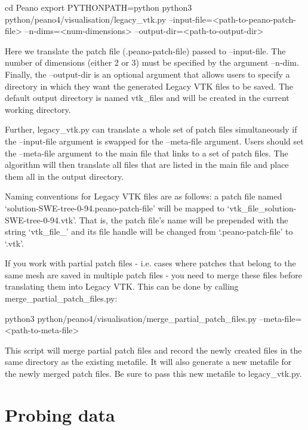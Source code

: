 \begin{code}
cd Peano
export PYTHONPATH=python
python3 python/peano4/visualisation/legacy_vtk.py --input-file=<path-to-peano-patch-file>
    --n-dims=<num-dimensions> --output-dir=<path-to-output-dir>
\end{code}

Here we translate the patch file (.peano-patch-file) passed to --input-file. The number of dimensions (either 2 or 3) must be specified by the argument --n-dim. Finally, the --output-dir is an optional argument that allows users to specify a directory in which they want the generated Legacy VTK files to be saved. The default output directory is named vtk\_files and will be created in the current working directory.

Further, legacy\_vtk.py can translate a whole set of patch files simultaneously if the --input-file argument is swapped for the --meta-file argument. Users should set the --meta-file argument to the main file that links to a set of patch files. The algorithm will then translate all files that are listed in the main file and place them all in the output directory.

Naming conventions for Legacy VTK files are as follows: a patch file named `solution-SWE-tree-0-94.peano-patch-file' will be mapped to `vtk\_file\_solution-SWE-tree-0-94.vtk'. That is, the patch file's name will be prepended with the string `vtk\_file\_' and its file handle will be changed from `.peano-patch-file' to `.vtk'.

\begin{remark}
 If you work with partial patch files - i.e. cases where patches that
 belong to the same mesh are saved in multiple patch files - you need to
 merge these files before translating them into Legacy VTK. This can be done
 by calling merge\_partial\_patch\_files.py:
    \begin{code}
        python3 python/peano4/visualisation/merge_partial_patch_files.py
            --meta-file=<path-to-meta-file>
    \end{code}
 This script will merge partial patch files and record the newly created files
 in the same directory as the existing metafile. It will also generate a new metafile
 for the newly merged patch files. Be sure to pass this new metafile to legacy\_vtk.py.
\end{remark}

\section{Probing data}
\label{section:postprocessing:probing}

